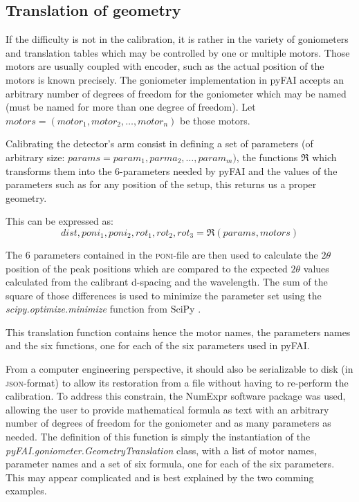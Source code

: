 \documentclass[preprint, pdf]{iucr}              %
\begin{document}
\subsection{Translation of geometry}

If the difficulty is not in the calibration, it is  rather in the variety of
goniometers and translation tables which may be controlled by one or multiple
motors.
Those motors are usually coupled with encoder, such as the actual position of
the motors is known precisely.
The goniometer implementation in pyFAI accepts an
arbitrary number of degrees of freedom for the goniometer which may be named 
(must be named for more than one degree of freedom). 
Let $motors = (motor_1, motor_2, \ldots, motor_n)$ be those motors. 

Calibrating the detector's arm consist in defining a set of parameters
(of arbitrary size: $params = param_1, parma_2, \ldots, param_m)$, the
functions $\Re$ which transforms them into the 6-parameters needed by pyFAI and 
the values of the parameters such as for any position of the setup, this returns
us a proper geometry.

This can be expressed as:
$$
dist, poni_1, poni_2, rot_1, rot_2, rot_3 = \Re(params, motors) $$

The 6 parameters contained in the \textsc{poni}-file  are then used to calculate
the $2\theta$ position of the peak positions which are compared to the expected $2\theta$
values calculated from the calibrant d-spacing and the wavelength. 
The sum of the square of those differences is used to minimize the parameter set
using the \textit{scipy.optimize.minimize} function from SciPy \cite{scipy}.

This translation function contains hence the motor names, the parameters names
and the six functions, one for each of the six parameters used in pyFAI. 

From a computer engineering perspective, it should also be serializable to 
disk (in \textsc{json}-format) to allow its restoration from a file without
having to re-perform the calibration. 
To address this constrain, the NumExpr software package \cite{numexpr} was
used, allowing the user to provide mathematical formula as text with an
arbitrary number of degrees of freedom for the goniometer and as many parameters
as needed.
The definition of this function is simply the instantiation of the
\textit{pyFAI.goniometer.GeometryTranslation} class, with a list of motor
names, parameter names and a set of six formula, one for each of the six parameters. 
This may appear complicated and is best explained by the two comming examples.
\end{document}
